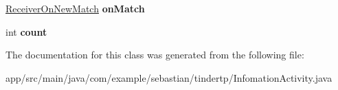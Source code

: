 \begin{DoxyCompactItemize}
\item 
\hyperlink{classcom_1_1example_1_1sebastian_1_1tindertp_1_1services_1_1ReceiverOnNewMatch}{Receiver\+On\+New\+Match} {\bfseries on\+Match}\hypertarget{classcom_1_1example_1_1sebastian_1_1tindertp_1_1InfomationActivity_abb5e767c612ad2c32f40990397362e2f}{}\label{classcom_1_1example_1_1sebastian_1_1tindertp_1_1InfomationActivity_abb5e767c612ad2c32f40990397362e2f}

\item 
int {\bfseries count}\hypertarget{classcom_1_1example_1_1sebastian_1_1tindertp_1_1InfomationActivity_a1eec4e3f89140ccd56dda5273a06533d}{}\label{classcom_1_1example_1_1sebastian_1_1tindertp_1_1InfomationActivity_a1eec4e3f89140ccd56dda5273a06533d}

\end{DoxyCompactItemize}


The documentation for this class was generated from the following file\+:\begin{DoxyCompactItemize}
\item 
app/src/main/java/com/example/sebastian/tindertp/Infomation\+Activity.\+java\end{DoxyCompactItemize}
